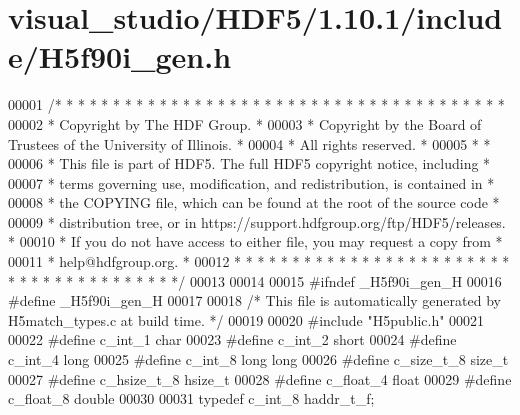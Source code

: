 \hypertarget{visual__studio_2_h_d_f5_21_810_81_2include_2_h5f90i__gen_8h_source}{}\section{visual\+\_\+studio/\+H\+D\+F5/1.10.1/include/\+H5f90i\+\_\+gen.h}
\label{visual__studio_2_h_d_f5_21_810_81_2include_2_h5f90i__gen_8h_source}

\begin{DoxyCode}
00001 \textcolor{comment}{/* * * * * * * * * * * * * * * * * * * * * * * * * * * * * * * * * * * * * * *}
00002 \textcolor{comment}{ * Copyright by The HDF Group.                                               *}
00003 \textcolor{comment}{ * Copyright by the Board of Trustees of the University of Illinois.         *}
00004 \textcolor{comment}{ * All rights reserved.                                                      *}
00005 \textcolor{comment}{ *                                                                           *}
00006 \textcolor{comment}{ * This file is part of HDF5.  The full HDF5 copyright notice, including     *}
00007 \textcolor{comment}{ * terms governing use, modification, and redistribution, is contained in    *}
00008 \textcolor{comment}{ * the COPYING file, which can be found at the root of the source code       *}
00009 \textcolor{comment}{ * distribution tree, or in https://support.hdfgroup.org/ftp/HDF5/releases.  *}
00010 \textcolor{comment}{ * If you do not have access to either file, you may request a copy from     *}
00011 \textcolor{comment}{ * help@hdfgroup.org.                                                        *}
00012 \textcolor{comment}{ * * * * * * * * * * * * * * * * * * * * * * * * * * * * * * * * * * * * * * */}
00013 
00014 
00015 \textcolor{preprocessor}{#ifndef \_H5f90i\_gen\_H}
00016 \textcolor{preprocessor}{#define \_H5f90i\_gen\_H}
00017 
00018 \textcolor{comment}{/* This file is automatically generated by H5match\_types.c at build time. */}
00019 
00020 \textcolor{preprocessor}{#include "H5public.h"}
00021 
00022 \textcolor{preprocessor}{#define c\_int\_1 char}
00023 \textcolor{preprocessor}{#define c\_int\_2 short}
00024 \textcolor{preprocessor}{#define c\_int\_4 long}
00025 \textcolor{preprocessor}{#define c\_int\_8 long long}
00026 \textcolor{preprocessor}{#define c\_size\_t\_8 size\_t}
00027 \textcolor{preprocessor}{#define c\_hsize\_t\_8 hsize\_t}
00028 \textcolor{preprocessor}{#define c\_float\_4 float}
00029 \textcolor{preprocessor}{#define c\_float\_8 double}
00030 
00031 \textcolor{keyword}{typedef} c\_int\_8 haddr\_t\_f;

\end{DoxyCode}
